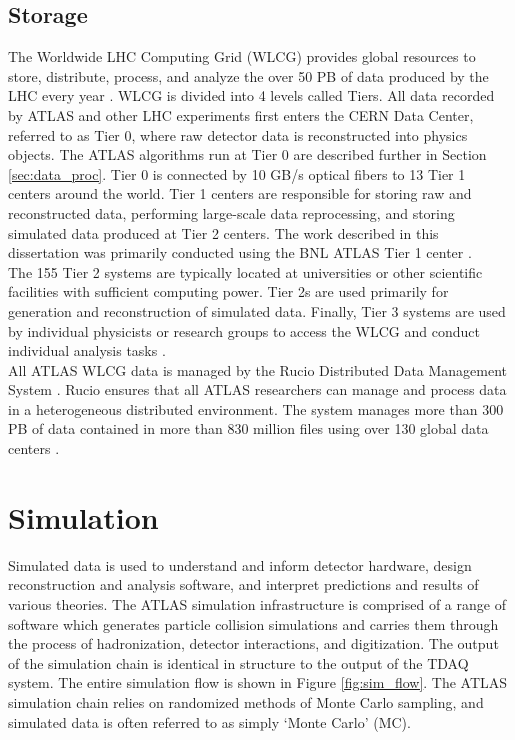 \subsection{Storage}\label{sec:storage}
The Worldwide LHC Computing Grid (WLCG) provides global resources to store, distribute, process, and analyze the over 50 PB of data produced by the LHC every year \cite{wlcg_web}. WLCG is divided into 4 levels called Tiers. All data recorded by ATLAS and other LHC experiments first enters the CERN Data Center, referred to as Tier 0, where raw detector data is reconstructed into physics objects. The ATLAS algorithms run at Tier 0 are described further in Section \ref{sec:data_proc}. Tier 0 is connected by 10 GB/s optical fibers to 13 Tier 1 centers around the world. Tier 1 centers are responsible for storing raw and reconstructed data, performing large-scale data reprocessing, and storing simulated data produced at Tier 2 centers. The work described in this dissertation was primarily conducted using the BNL ATLAS Tier 1 center \cite{bnl}.\\

The 155 Tier 2 systems are typically located at universities or other scientific facilities with sufficient computing power. Tier 2s are used primarily for generation and reconstruction of simulated data. Finally, Tier 3 systems are used by individual physicists or research groups to access the WLCG and conduct individual analysis tasks \cite{grid_tdr}.\\

All ATLAS WLCG data is managed by the Rucio Distributed Data Management System \cite{rucio}. Rucio ensures that all ATLAS researchers can manage and process data in a heterogeneous distributed environment. The system manages more than 300 PB of data contained in more than 830 million files using over 130 global data centers \cite{rucio_run2}. 

\section{Simulation}
Simulated data is used to understand and inform detector hardware, design reconstruction and analysis software, and interpret predictions and results of various theories. The ATLAS simulation infrastructure is comprised of a range of software which generates particle collision simulations and carries them through the process of hadronization, detector interactions, and digitization. The output of the simulation chain is identical in structure to the output of the TDAQ system. The entire simulation flow is shown in Figure \ref{fig:sim_flow}. The ATLAS simulation chain relies on randomized methods of Monte Carlo sampling, and simulated data is often referred to as simply `Monte Carlo' (MC).\\ 

